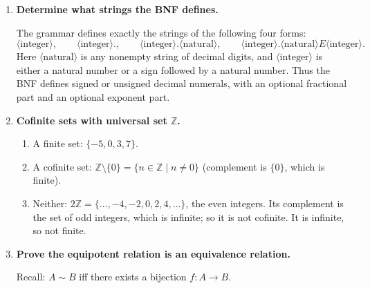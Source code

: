 \documentclass[11pt,openany]{book}
\def\ZN{\mathbb{Z}}
\begin{document}
\begin{enumerate}[{0.}1. ]
($\Rightarrow$) Assume ordinary induction. The strong induction hypotheses are $P(0)$ and $(\forall m)((\forall i\leq m)P(i)\Rightarrow P(m+1))$. Define $Q(n) = (\forall i\leq n)P(i)$. Clearly $Q(0)\Leftrightarrow P(0)$. The strong hypothesis says $Q(m)\Rightarrow P(m+1)$, which means $Q(m)\Rightarrow Q(m+1)$ (since $Q(m+1) = Q(m)\wedge P(m+1)$). By ordinary induction on $Q$, $(\forall n)Q(n)$, hence $(\forall n)P(n)$.

($\Leftarrow$) Ordinary induction is the special case of strong induction where the hypothesis uses only $P(m)$ instead of $(\forall i\leq m)P(i)$.

\item \textbf{Determine what strings the BNF defines.}

The grammar defines exactly the strings of the following four forms:
\[
\langle\text{integer}\rangle,\qquad
\langle\text{integer}\rangle.,\qquad
\langle\text{integer}\rangle.\langle\text{natural}\rangle,\qquad
\langle\text{integer}\rangle.\langle\text{natural}\rangle E \langle\text{integer}\rangle.
\]
Here $\langle\text{natural}\rangle$ is any nonempty string of decimal digits, and
$\langle\text{integer}\rangle$ is either a natural number or a sign followed by a
natural number. Thus the BNF defines signed or unsigned decimal numerals, with
an optional fractional part and an optional exponent part.

\item \textbf{Cofinite sets with universal set $\ZN$.}

\begin{enumerate}
\item A finite set: $\{-5,0,3,7\}$.
\item A cofinite set: $\ZN\setminus\{0\} = \{n\in\ZN \mid n\neq 0\}$ (complement is $\{0\}$, which is finite).
\item Neither: $2\ZN = \{\ldots,-4,-2,0,2,4,\ldots\}$, the even integers. Its complement is the set of odd integers, which is infinite; so it is not cofinite. It is infinite, so not finite.
\end{enumerate}

\item \textbf{Prove the equipotent relation is an equivalence relation.}

Recall: $A \sim B$ iff there exists a bijection $f: A\to B$.


\end{enumerate}
\end{document}
